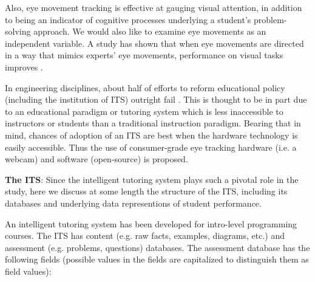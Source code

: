 \documentclass[hidelinks,11pt]{article}
\begin{document}
Also, eye movement tracking is effective at gauging visual attention, in
addition to being an indicator of cognitive processes underlying a student’s
problem-solving approach.   We would also like to examine eye movements as an
independent variable.  A study has shown that when eye movements are directed
in a way that mimics experts’ eye movements, performance on visual tasks
improves {\citep{grant2003}}.

In engineering disciplines, about half of efforts to reform educational policy
(including the institution of ITS) outright fail {\citep{henderson2011}}.  This
is thought to be in part due to an educational paradigm or tutoring system
which is less inaccessible to instructors or students than a traditional
instruction paradigm. Bearing that in mind, chances of adoption of an ITS are
best when the hardware technology is easily accessible.  Thus the use of
consumer-grade eye tracking hardware (i.e. a webcam) and software (open-source)
is proposed.

\textbf{The ITS}:  Since the intelligent tutoring system plays such a pivotal
role in the study, here we discuss at some length the structure of the ITS,
including its databases and underlying data representions of student
performance.

An intelligent tutoring system has been developed for intro-level
programming courses.  The ITS has content (e.g. raw facts, examples, diagrams,
etc.) and assessment (e.g. problems, questions) databases. The assessment
database has the following fields (possible values in the fields are
capitalized to distinguish them as field values):
\end{document}
